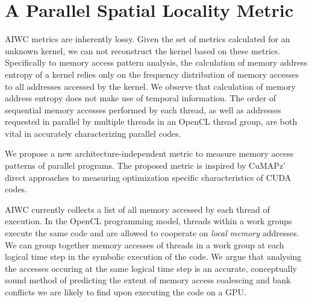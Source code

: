 \documentclass[review=false, sigchi]{acmart}
\begin{document}
	\section{A Parallel Spatial Locality Metric} \label{discussion}
	
	AIWC metrics are inherently lossy. Given the set of metrics calculated for an unknown kernel, we can not reconstruct the kernel based on these metrics. Specifically to memory access pattern analysis, the calculation of memory address entropy of a kernel relies only on the frequency distribution of memory accesses to all addresses accessed by the kernel. We observe that calculation of memory address entropy does not make use of temporal information. The order of sequential memory accesses performed by each thread, as well as addresses requested in parallel by multiple threads in an OpenCL thread group, are both vital in accurately characterizing parallel codes.
	
	We propose a new architecture-independent metric to measure memory access patterns of parallel programs.
	The proposed metric is inspired by CuMAPz' direct approaches to measuring optimization specific characteristics of CUDA codes.
	
	AIWC currently collects a list of all memory accessed by each thread of execution.
	In the OpenCL programming model, threads within a work groups execute the same code and are allowed to cooperate on \textit{local memory} addresses.
	We can group together memory accesses of threads in a work group at each logical time step in the symbolic execution of the code.
	We argue that analysing the accesses occuring at the same logical time step is an accurate, conceptually sound method of predicting the extent of memory access coalescing and bank conflicts we are likely to find upon executing the code on a GPU.
	
\end{document}
